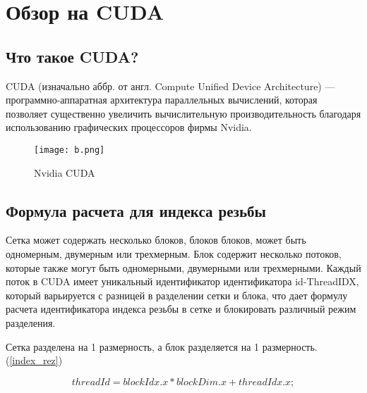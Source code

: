 \documentclass[a4paper, 12pt]{report}
\begin{document}

    \chapter{Обзор на CUDA}
    \section{Что такое CUDA?}
	
    CUDA (изначально аббр. от англ. Compute Unified Device Architecture) — программно-аппаратная архитектура параллельных вычислений, которая позволяет существенно увеличить вычислительную производительность благодаря использованию графических процессоров фирмы Nvidia.
    \begin{figure}[h!]
	\centering
	\texttt{[image: b.png]}
	\caption{Nvidia CUDA}
	\label{}
    \end{figure}
    \section{Формула расчета для индекса резьбы}
    Сетка может содержать несколько блоков, блоков блоков, может быть одномерным, двумерным или трехмерным. Блок содержит несколько потоков, которые также могут быть одномерными, двумерными или трехмерными.
    Каждый поток в CUDA имеет уникальный идентификатор идентификатора id-ThreadIDX, который варьируется с разницей в разделении сетки и блока, что дает формулу расчета идентификатора индекса резьбы в сетке и блокировать различный режим разделения.
    
    Сетка разделена на 1 размерность, а блок разделяется на 1 размерность.(\ref{index_rez})

    \begin{equation}
       	threadId = blockIdx.x *blockDim.x + threadIdx.x;  		
        \label{index_rez}
    \end{equation}

    

 
\end{document}
